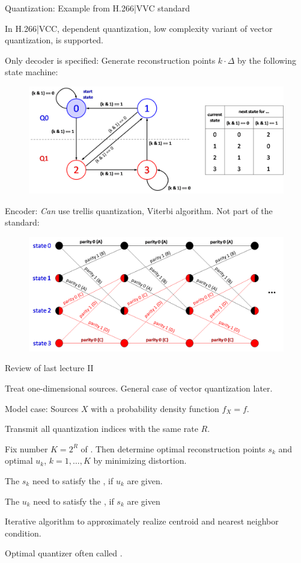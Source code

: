 \begin{frame}{Quantization: Example from H.266|VVC standard}
\bit
\item In H.266|VCC, dependent quantization, low complexity variant of vector quantization, is supported.
\item Only decoder is specified: Generate reconstruction points $k\cdot\Delta$ by the following  state machine:
\begin{figure}
\includegraphics[width=.40\textwidth]{Quant_II/DepQuant.png}
\end{figure}
\item Encoder: \textit{Can} use trellis quantization, Viterbi algorithm. Not 
part of the standard:
\begin{figure}
\includegraphics[width=.30\textwidth]{Quant_II/trellis.png}
\end{figure}
\eit
\end{frame}

\begin{frame}{Review of last lecture II}
\bit
\item  Treat one-dimensional sources. General case of vector quantization later.  
\item Model case: Sources $X$ with a probability density function $f_X=f$. 
\eit

\bit
\item Transmit all quantization indices with the same rate $R$.
\item [\iarrow] Fix number  $K=2^R$ of . Then  determine optimal reconstruction points $s_k$ and optimal  
$u_k$, $k=1,\dots,K$  by minimizing distortion.   
\item The $s_k$ need to satisfy the , if $u_k$ are given. 
\item The $u_k$ need to satisfy the , if $s_k$ are given 
\item {} Iterative algorithm to approximately realize centroid and nearest neighbor condition. 
\item Optimal quantizer often called . 
\eit
{} 
\end{frame}

